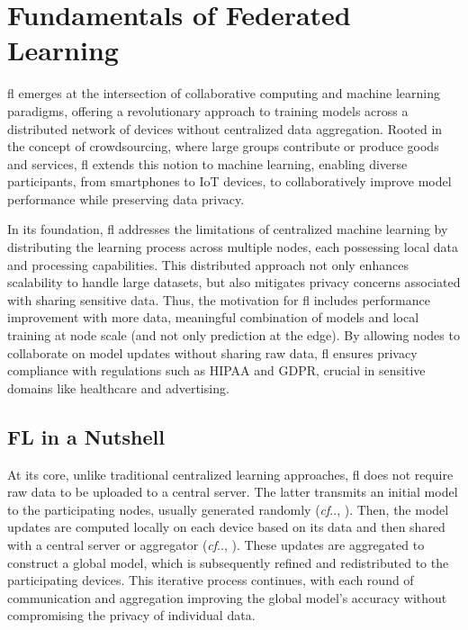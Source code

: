 \documentclass[conference]{IEEEtran}
\makeatletter
\DeclareRobustCommand\onedot{\futurelet\@let@token\@onedot}
\def\@onedot{\ifx\@topicslet@token.\else.\null\fi\xspace}
\def\cf{\emph{cf}\onedot} \def\Cf{\emph{C.f}\onedot}
\makeatother
\begin{document}
\section{Fundamentals of Federated Learning\label{sec:fl}} %

\Gls{fl} emerges at the intersection of collaborative computing and machine learning paradigms, offering a revolutionary approach to training models across a distributed network of devices without centralized data aggregation.
Rooted in the concept of crowdsourcing, where large groups contribute or produce goods and services, \gls{fl} extends this notion to machine learning, enabling diverse participants, from smartphones to IoT devices, to collaboratively improve model performance while preserving data privacy.


In its foundation, \gls{fl} addresses the limitations of centralized machine learning by distributing the learning process across multiple nodes, each possessing local data and processing capabilities.
This distributed approach not only enhances scalability to handle large datasets, but also mitigates privacy concerns associated with sharing sensitive data.
Thus, the motivation for \gls{fl} includes performance improvement with more data, meaningful combination of models and local training at node scale (and not only prediction at the edge).
By allowing nodes to collaborate on model updates without sharing raw data, \gls{fl} ensures privacy compliance with regulations such as HIPAA and GDPR, crucial in sensitive domains like healthcare and advertising.


\subsection{FL in a Nutshell}

At its core, unlike traditional centralized learning approaches, \gls{fl} does not require raw data to be uploaded to a central server.
The latter transmits an initial model to the participating nodes, usually generated randomly (\cf, ).
Then, the model updates are computed locally on each device based on its data and then shared with a central server or aggregator (\cf, ).
These updates are aggregated to construct a global model, which is subsequently refined and redistributed to the participating devices.
This iterative process continues, with each round of communication and aggregation improving the global model's accuracy without compromising the privacy of individual data.
\end{document}
